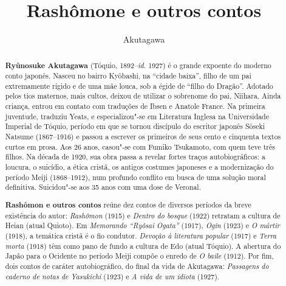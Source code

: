 \documentclass[12pt]{extarticle}
\begin{document}
\newcommand{\AutorLivro}{Akutagawa}
\newcommand{\TituloLivro}{Rashômone e outros contos}
\newcommand{\Tema}{Ficção, mistério e fantasia}
\newcommand{\Genero}{Conto, crônica e novela}
\newcommand{\imagemCapa}{./images/PNLD0009-01.png}
\newcommand{\issnppub}{---}
\newcommand{\issnepub}{---}
\newcommand{\colaborador}{\textbf{Cesar Augusto Araujo Oyakawa, Bruno Gradella e Vicente Castro} é uma pessoa incrível e vai fazer um bom serviço.}


\title{\TituloLivro}
\author{\AutorLivro}
\def\authornotes{\colaborador}

\date{}
\maketitle

\baselineskip\par

\begin{abstract}

\textbf{Ryûnosuke Akutagawa} (Tóquio, 1892--\textit{id.} 1927) é o grande
  expoente do moderno conto japonês. Nasceu no bairro Kyôbashi, na ``cidade
  baixa'', filho de um pai extremamente rígido e de uma mãe louca, sob a égide
  de ``filho do Dragão''. Adotado pelos tios maternos, mais cultos, deixou de
  utilizar o sobrenome do pai, Niihara. Ainda criança, entrou em contato com
  traduções de Ibsen e Anatole France. Na primeira juventude, traduziu Yeats, e
  especializou"-se em Literatura Inglesa na Universidade Imperial de Tóquio,
  período em que se tornou discípulo do escritor japonês Sôseki Natsume
  (1867--1916) e passou a escrever os primeiros de seus cento e cinquenta
  textos curtos em prosa. Aos 26 anos, casou"-se com Fumiko Tsukamoto, com quem
  teve três filhos.  Na década de 1920, sua obra passa a revelar fortes traços
  autobiográficos: a loucura, o suicídio, a ética cristã, os antigos costumes
  japoneses e a modernização do período Meiji (1868--1912), num profundo
  conflito em busca de uma solução moral definitiva.  Suicidou"-se aos 35 anos
  com uma dose de Veronal. 
        
\textbf{Rashômon e outros contos} reúne dez contos de diversos períodos da
  breve existência do autor: \textit{Rashômon} (1915) e \textit{Dentro do
  bosque} (1922) retratam a cultura de Heian (atual Quioto). Em
  \textit{Memorando ``Ryôsai Ogata''} (1917), \textit{Ogin} (1923) e \textit{O
  mártir} (1918), a temática cristã é o fio condutor.  \textit{Devoção à
  literatura popular} (1917) e \textit{Terra morta} (1918) têm como pano de
  fundo a cultura de Edo (atual Tóquio). A abertura do Japão para o Ocidente no
  período Meiji compõe o enredo de \textit{O baile} (1912). Por fim, dois
  contos de caráter autobiográfico, do final da vida de Akutagawa:
  \textit{Passagens do caderno de notas de Yasukichi} (1923) e \textit{A vida
de um idiota} (1927).      \end{abstract}
\end{document}
